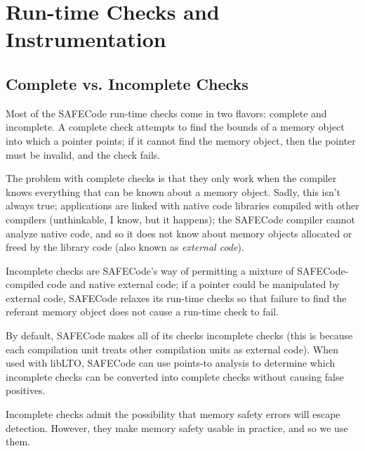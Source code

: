 \section{Run-time Checks and Instrumentation}
\label{section:checks}

\subsection{Complete vs. Incomplete Checks}
\label{section:checks:complete}

Most of the SAFECode run-time checks come in two flavors: complete
and incomplete.  A complete check attempts to find the bounds of a
memory object into which a pointer points; if it cannot find the
memory object, then the pointer must be invalid, and the check fails.

The problem with complete checks is that they only work when the
compiler knows everything that can be known about a memory object.
Sadly, this isn't always true; applications are linked with native
code libraries compiled with other compilers (unthinkable, I know, but
it happens); the SAFECode compiler cannot analyze native code, and so
it does not know about memory objects allocated or freed by the
library code (also known as \emph{external code}).

Incomplete checks are SAFECode's way of permitting a mixture of
SAFECode-compiled code and native external code; if a pointer could be
manipulated by external code, SAFECode relaxes its run-time checks so
that failure to find the referant memory object does not cause a
run-time check to fail.

By default, SAFECode makes all of its checks incomplete checks (this
is because each compilation unit treats other compilation units as
external code).  When used with libLTO, SAFECode can use points-to
analysis to determine which incomplete checks can be converted into
complete checks without causing false positives.

Incomplete checks admit the possibility that memory safety errors will escape
detection.  However, they make memory safety usable in practice, and
so we use them.

